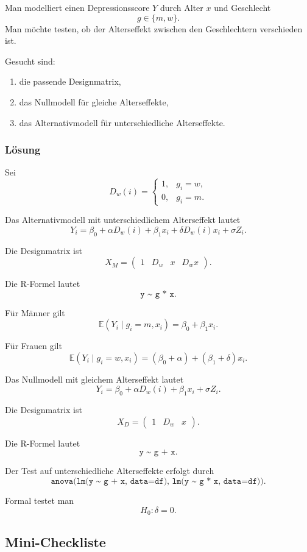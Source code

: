 \documentclass[10pt, letterpaper]{article}
\begin{document}
Man modelliert einen Depressionsscore \(Y\) durch Alter \(x\) und Geschlecht
\[
g\in\{m,w\}.
\]
Man möchte testen, ob der Alterseffekt zwischen den Geschlechtern verschieden ist.

Gesucht sind:
\begin{enumerate}
    \item die passende Designmatrix,
    \item das Nullmodell für gleiche Alterseffekte,
    \item das Alternativmodell für unterschiedliche Alterseffekte.
\end{enumerate}

\subsubsection*{Lösung}

Sei
\[
D_w(i)=
\begin{cases}
1, & g_i=w,\\
0, & g_i=m.
\end{cases}
\]

Das Alternativmodell mit unterschiedlichem Alterseffekt lautet
\[
Y_i
=
\beta_0+\alpha D_w(i)+\beta_1x_i+\delta D_w(i)x_i+\sigma Z_i.
\]

Die Designmatrix ist
\[
X_M=
\begin{pmatrix}
1 & D_w & x & D_wx
\end{pmatrix}.
\]

Die R-Formel lautet
\[
\texttt{y \textasciitilde{} g * x}.
\]

Für Männer gilt
\[
\mathbb E(Y_i\mid g_i=m,x_i)
=
\beta_0+\beta_1x_i.
\]

Für Frauen gilt
\[
\mathbb E(Y_i\mid g_i=w,x_i)
=
(\beta_0+\alpha)+(\beta_1+\delta)x_i.
\]

Das Nullmodell mit gleichem Alterseffekt lautet
\[
Y_i=\beta_0+\alpha D_w(i)+\beta_1x_i+\sigma Z_i.
\]

Die Designmatrix ist
\[
X_D=
\begin{pmatrix}
1 & D_w & x
\end{pmatrix}.
\]

Die R-Formel lautet
\[
\texttt{y \textasciitilde{} g + x}.
\]

Der Test auf unterschiedliche Alterseffekte erfolgt durch
\[
\texttt{anova(lm(y \textasciitilde{} g + x, data=df), lm(y \textasciitilde{} g * x, data=df))}.
\]

Formal testet man
\[
H_0:\delta=0.
\]

\subsection{Mini-Checkliste}
\end{document}
